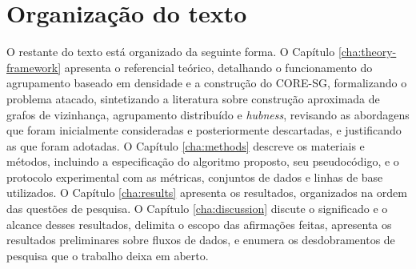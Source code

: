 \section{Organização do texto\label{sec:text-organization}}

O restante do texto está organizado da seguinte forma. O Capítulo \ref{cha:theory-framework} apresenta o referencial teórico, detalhando o funcionamento do agrupamento baseado em densidade e a construção do \ac{CORE-SG}, formalizando o problema atacado, sintetizando a literatura sobre construção aproximada de grafos de vizinhança, agrupamento distribuído e \textit{hubness}, revisando as abordagens que foram inicialmente consideradas e posteriormente descartadas, e justificando as que foram adotadas. O Capítulo \ref{cha:methods} descreve os materiais e métodos, incluindo a especificação do algoritmo proposto, seu pseudocódigo, e o protocolo experimental com as métricas, conjuntos de dados e linhas de base utilizados. O Capítulo \ref{cha:results} apresenta os resultados, organizados na ordem das questões de pesquisa. O Capítulo \ref{cha:discussion} discute o significado e o alcance desses resultados, delimita o escopo das afirmações feitas, apresenta os resultados preliminares sobre fluxos de dados, e enumera os desdobramentos de pesquisa que o trabalho deixa em aberto.\\
